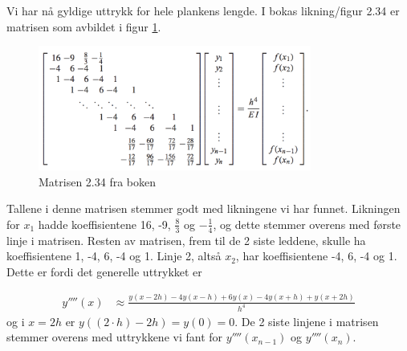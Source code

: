 Vi har nå gyldige uttrykk for hele plankens lengde. I bokas likning/figur 2.34 er matrisen som avbildet i figur \ref{fig:EBMatrix}. 
\begin{figure}[h]
    \centering
    \includegraphics[width=0.8\textwidth]{sections/Theory/EBMatrix}
    \caption{Matrisen 2.34 fra boken}
    \label{fig:EBMatrix}
\end{figure}
Tallene i denne matrisen stemmer godt med likningene vi har funnet. Likningen for $x_1$ hadde koeffisientene 16, -9, $\frac{8}{3}$ og $-\frac{1}{4}$, og dette stemmer overens med første linje i matrisen. Resten av matrisen, frem til de 2 siste leddene, skulle ha koeffisientene 1, -4, 6, -4 og 1. Linje 2, altså $x_2$, har koeffisientene -4, 6, -4 og 1. Dette er fordi det generelle uttrykket er 

\begin{align}
    y''''(x)& \approx \frac{y(x-2h)-4y(x-h)+6y(x)-4y(x+h)+y(x+2h)}{h^4} \nonumber
\end{align}
og i $x=2h$ er $y((2\cdot h)-2h)=y(0)=0$. De 2 siste linjene i matrisen stemmer overens med uttrykkene vi fant for $y''''(x_{n-1})$ og $y''''(x_n)$. 






